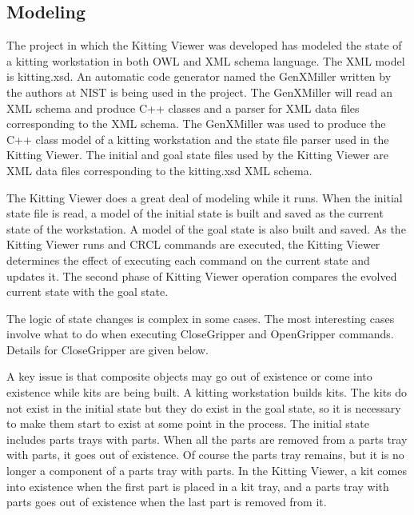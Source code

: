 \subsection{Modeling}
The project in which the Kitting Viewer was developed has modeled the state
of a kitting workstation in both OWL and XML schema language. The XML model
is kitting.xsd. An automatic code generator named the GenXMiller written by
the authors at NIST is being used in the project. The GenXMiller will read
an XML schema and produce C++ classes and a parser for XML data files
corresponding to the XML schema. The GenXMiller was used to produce the C++
class model of a kitting workstation and the state file parser used in the
Kitting Viewer. The initial and goal state files used by the Kitting Viewer
are XML data files corresponding to the kitting.xsd XML schema.

The Kitting Viewer does a great deal of modeling while it runs. When the
initial state file is read, a model of the initial state is built and saved
as the current state of the workstation. A model of the goal state is also
built and saved. As the Kitting Viewer runs and CRCL commands are executed,
the Kitting Viewer determines the effect of executing each command on the
current state and updates it. The second phase of Kitting Viewer operation
compares the evolved current state with the goal state.

The logic of state changes is complex in some cases. The most interesting
cases involve what to do when executing CloseGripper and OpenGripper
commands. Details for CloseGripper are given below. 

A key issue is that composite objects may go out of existence or come into
existence while kits are being built. A kitting workstation builds kits.
The kits do not exist in the initial state but they do exist in the goal
state, so it is necessary to make them start to exist at some point in the
process. The initial state includes parts trays with parts. When all the
parts are removed from a parts tray with parts, it goes out of existence.
Of course the parts tray remains, but it is no longer a component of a
parts tray with parts. In the Kitting Viewer, a kit comes into existence
when the first part is placed in a kit tray, and a parts tray with parts
goes out of existence when the last part is removed from it.

